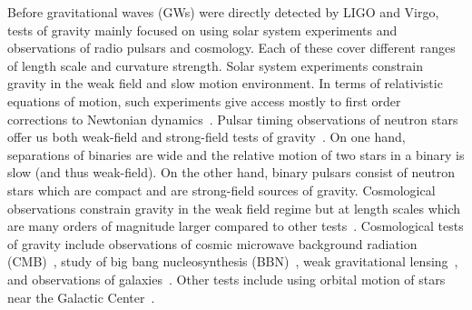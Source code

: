 \documentclass[prd,twocolumn,nofootinbib]{revtex4-1}
\begin{document}
Before gravitational waves (GWs) were directly detected by LIGO and Virgo, tests of gravity mainly focused on using solar system experiments and observations of radio pulsars and cosmology. Each of these cover different ranges of length scale and curvature strength. Solar system experiments constrain gravity in the weak field and slow motion environment. In terms of relativistic equations of motion, such experiments give access mostly to first order corrections to Newtonian dynamics~\cite{Berti:2015itd,Will:2014kxa}. Pulsar timing observations of neutron stars offer us both weak-field and strong-field tests of gravity~\cite{Freire:2012mg,Kramer:2006nb,Liu:2011ae,Ransom:2014xla,Stairs:2002cw,Stairs:1997kz,Stairs:2003eg,taylor1992experimental,Wex:2014nva,Yunes:2013dva}. 
On one hand, separations of binaries are wide and the relative motion of two stars in a binary is slow (and thus weak-field). On the other hand, binary pulsars consist of neutron stars which are compact and are strong-field sources of gravity.
Cosmological observations constrain gravity in the weak field regime but at length scales which are many orders of magnitude larger compared to other tests~\cite{Berti:2015itd,Clifton:2011jh,Jain:2010ka,Joyce:2014kja,Koyama:2015vza}. Cosmological tests of gravity include observations of cosmic microwave background radiation (CMB)~\cite{0004-637X-737-2-98,Akrami:2018odb,Ade:2015xua,Salvatelli:2016mgy,Ade:2015xua,Bennett:2012zja,Hinshaw:2012aka}, study of big bang nucleosynthesis (BBN)~\cite{Clifton:2005xr,Coc:2006rt,Damour:1998ae,Komatsu:2010fb,Mathews:2017xht,Olive:1999ij,PhysRevD.56.7627}, weak gravitational lensing~\cite{Abbott:2005bi,Bartelmann:1999yn,Collett:2018gpf,Clowe:2006eq,Huterer2010,Lewis:2006fu}, and observations of galaxies~\cite{Berti:2015itd}. 
Other tests include using orbital motion of stars near the Galactic Center~\cite{Ghez:2003qj,Hees:2017aal,Abuter:2018drb}. 
\end{document}
